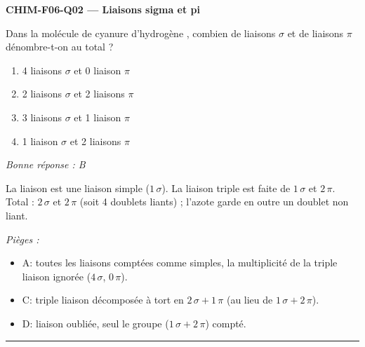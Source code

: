 \documentclass[11pt,a4paper]{article}
\begin{document}
\noindent\textbf{CHIM-F06-Q02 --- Liaisons sigma et pi}\par
Dans la molécule de cyanure d'hydrogène , combien de liaisons $\sigma$ et de liaisons
$\pi$ dénombre-t-on au total ?
\begin{enumerate}[label=\Alph*)]
\item \num{4} liaisons $\sigma$ et \num{0} liaison $\pi$
\item \num{2} liaisons $\sigma$ et \num{2} liaisons $\pi$
\item \num{3} liaisons $\sigma$ et \num{1} liaison $\pi$
\item \num{1} liaison $\sigma$ et \num{2} liaisons $\pi$
\end{enumerate}
\textit{Bonne réponse : B}\par
La liaison  est une liaison simple ($1\,\sigma$). La liaison triple  est faite de
$1\,\sigma$ et $2\,\pi$. Total : $2\,\sigma$ et $2\,\pi$ (soit 4 doublets liants) ; l'azote garde en
outre un doublet non liant.\par
\textit{Pièges :}
\begin{itemize}
\item A: toutes les liaisons comptées comme simples, la multiplicité de la triple liaison ignorée ($4\,\sigma$, $0\,\pi$).
\item C: triple liaison décomposée à tort en $2\,\sigma+1\,\pi$ (au lieu de $1\,\sigma+2\,\pi$).
\item D: liaison  oubliée, seul le groupe  ($1\,\sigma+2\,\pi$) compté.
\end{itemize}
\vspace{8pt}\hrule\vspace{8pt}
\end{document}
